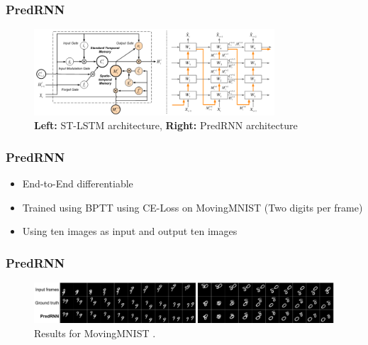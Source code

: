   \begin{frame}
   \frametitle{PredRNN}
   
   \begin{figure}[H]
    \includegraphics[width=0.8\textwidth]{../Images/wang.png}
    \centering
    \caption{\textbf{Left:} ST-LSTM architecture, \textbf{Right:} PredRNN architecture \cite{Wang2017}}
    \label{fig:wang_architecture}
   \end{figure}
   
  \end{frame}
  \begin{frame}
   \frametitle{PredRNN}
   
   \begin{itemize}
    \item<1-> End-to-End differentiable
    \item<2-> Trained using BPTT using CE-Loss on MovingMNIST (Two digits per frame)
    \item<3-> Using ten images as input and output ten images
   \end{itemize}      
   
  \end{frame}
  \begin{frame}
   \frametitle{PredRNN}
   
   \begin{figure}[H]
   \includegraphics[width=1.0\textwidth]{../Images/predrnn_mnist.png}
   \centering
   \caption{Results for MovingMNIST \cite{Wang2017}.}
   \label{fig:predrnn_mnist}
  \end{figure}   
   
  \end{frame}
  
